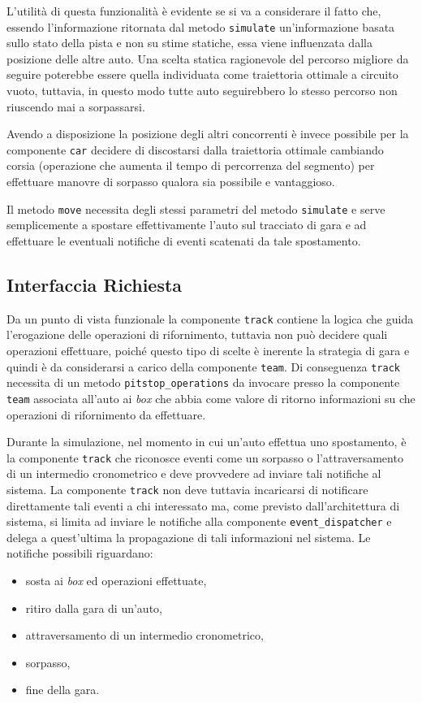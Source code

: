 \documentclass[11pt,a4paper]{report}
\newcommand{\fun}[1]{\texttt{#1}}
\begin{document}
L'utilità di questa funzionalità è evidente se si va a considerare il fatto che, essendo l'informazione ritornata dal metodo \fun{simulate} un'informazione basata sullo stato della pista e non su stime statiche, essa viene influenzata dalla posizione delle altre auto. Una scelta statica ragionevole del percorso migliore da seguire poterebbe essere quella individuata come traiettoria ottimale a circuito vuoto, tuttavia, in questo modo tutte auto seguirebbero lo stesso percorso non riuscendo mai a sorpassarsi.

Avendo a disposizione la posizione degli altri concorrenti è invece possibile per la componente \texttt{car} decidere di discostarsi dalla traiettoria ottimale cambiando corsia (operazione che aumenta il tempo di percorrenza del segmento) per effettuare manovre di sorpasso qualora sia possibile e vantaggioso.

Il metodo \fun{move} necessita degli stessi parametri del metodo \fun{simulate} e serve semplicemente a spostare effettivamente l'auto sul tracciato di gara e ad effettuare le eventuali notifiche di eventi scatenati da tale spostamento.

\subsection*{Interfaccia Richiesta}
Da un punto di vista funzionale la componente \texttt{track} contiene la logica che guida l'erogazione delle operazioni di rifornimento, tuttavia non può decidere quali operazioni effettuare, poiché questo tipo di scelte è inerente la strategia di gara e quindi è da considerarsi a carico della componente \texttt{team}. Di conseguenza \texttt{track} necessita di un metodo \fun{pitstop\_operations} da invocare presso la componente \texttt{team} associata all'auto ai \textit{box} che abbia come valore di ritorno informazioni su che operazioni di rifornimento da effettuare.

Durante la simulazione, nel momento in cui un'auto effettua uno spostamento, è la componente \texttt{track} che riconosce eventi come un sorpasso o l'attraversamento di un intermedio cronometrico e deve provvedere ad inviare tali notifiche al sistema. La componente \texttt{track} non deve tuttavia incaricarsi di notificare direttamente tali eventi a chi interessato ma, come previsto dall'architettura di sistema, si limita ad inviare le notifiche alla componente \texttt{event\_dispatcher} e delega a quest'ultima la propagazione di tali informazioni nel sistema.
Le notifiche possibili riguardano:
\begin{itemize}
\item sosta ai \textit{box} ed operazioni effettuate,
\item ritiro dalla gara di un'auto,
\item attraversamento di un intermedio cronometrico,
\item sorpasso,
\item fine della gara.
\end{itemize}
\end{document}
